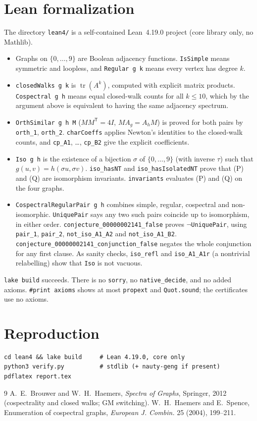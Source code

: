 \documentclass[11pt]{article}
\theoremstyle{remark}
\begin{document}
\section{Lean formalization}
The directory \texttt{lean4/} is a self-contained Lean~4.19.0 project (core
library only, no Mathlib).
\begin{itemize}
\item Graphs on $\{0,\dots,9\}$ are Boolean adjacency functions.
\texttt{IsSimple} means symmetric and loopless, and \texttt{Regular g k} means
every vertex has degree $k$.
\item \texttt{closedWalks g k} is $\operatorname{tr}(A^k)$, computed with explicit
matrix products. \texttt{Cospectral g h} means equal closed-walk counts for
all $k\le10$, which by the argument above is equivalent to having the same
adjacency spectrum.
\item \texttt{OrthSimilar g h M} ($MM^{\mathsf T}=4I$, $MA_g=A_hM$) is proved for both
pairs by \texttt{orth\_1}, \texttt{orth\_2}. \texttt{charCoeffs} applies Newton's
identities to the closed-walk counts, and \texttt{cp\_A1}, \dots, \texttt{cp\_B2} give the
explicit coefficients.
\item \texttt{Iso g h} is the existence of a bijection $\sigma$ of
$\{0,\dots,9\}$ (with inverse $\tau$) such that $g(u,v)=h(\sigma u,\sigma v)$.
\texttt{iso\_hasNT} and \texttt{iso\_hasIsolatedNT} prove that (P) and (Q) are
isomorphism invariants. \texttt{invariants} evaluates (P) and (Q) on the four
graphs.
\item \texttt{CospectralRegularPair g h} combines simple, regular, cospectral
and non-isomorphic. \texttt{UniquePair} says any two such pairs coincide up to
isomorphism, in either order. \texttt{conjecture\_00000002141\_false} proves
$\neg$\texttt{UniquePair}, using \texttt{pair\_1}, \texttt{pair\_2},
\texttt{not\_iso\_A1\_A2} and \texttt{not\_iso\_A1\_B2}.
\texttt{conjecture\_00000002141\_conjunction\_false} negates the whole
conjunction for any first clause. As sanity checks, \texttt{iso\_refl} and
\texttt{iso\_A1\_A1r} (a nontrivial relabelling) show that \texttt{Iso} is not
vacuous.
\end{itemize}
\texttt{lake build} succeeds. There is no \texttt{sorry}, no
\texttt{native\_decide}, and no added axioms. \texttt{\#print axioms} shows at
most \texttt{propext} and \texttt{Quot.sound}; the certificates use no axioms.

\section{Reproduction}
\begin{verbatim}
cd lean4 && lake build     # Lean 4.19.0, core only
python3 verify.py          # stdlib (+ nauty-geng if present)
pdflatex report.tex
\end{verbatim}

\begin{thebibliography}{9}
 A.~E.~Brouwer and W.~H.~Haemers, \emph{Spectra of Graphs},
Springer, 2012 (cospectrality and closed walks; GM switching).
 W.~H.~Haemers and E.~Spence, Enumeration of cospectral graphs,
\emph{European J. Combin.} 25 (2004), 199--211.
\end{thebibliography}
\end{document}
